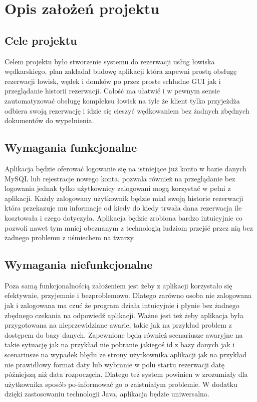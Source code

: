 \chapter{Opis założeń projektu}
\label{chap:opis}


\section*{Cele projektu}
Celem projektu było stworzenie systemu do rezerwacji usług łowiska wędkarskiego, plan zakładał budowę aplikacji która zapewni prostą obsługę rezerwacji łowisk, wędek i domków po przez proste schludne GUI jak i przeglądanie historii rezerwacji. Całość ma ułatwić i w pewnym sensie zautomatyzować
obsługę kompleksu łowisk na tyle że klient tylko przyjeżdża odbiera swoją rezerwację i idzie się cieszyć wędkowaniem bez żadnych zbędnych dokumentów do wypełnienia.

\section*{Wymagania funkcjonalne}
Aplikacja będzie oferować logowanie się na istniejące już konto w bazie danych MySQL lub rejestracje nowego konta, pozwala również na przeglądanie bez logowania jednak tylko użytkownicy zalogowani mogą korzystać w pełni z aplikacji. Każdy zalogowany użytkownik będzie miał swoją historie rezerwacji która przekazuje mu informacje od kiedy do kiedy trwała dana rezerwacja ile kosztowała i czego dotyczyła. Aplikacja będzie zrobiona bardzo intuicyjnie co pozwoli nawet tym mniej obeznanym z technologią ludziom przejść przez nią bez żadnego problemu z uśmiechem na twarzy.


\section*{Wymagania niefunkcjonalne}
Poza samą funkcjonalnością założeniem jest żeby z aplikacji korzystało się efektywnie, przyjemnie i bezproblemowo. Dlatego zarówno osoba nie zalogowana jak i zalogowana ma czuć że program działa intuicyjnie i płynie bez żadnego zbędnego czekania na odpowiedź aplikacji. Ważne jest też żeby aplikacja była przygotowana na nieprzewidziane awarie, takie jak na przykład problem z dostępem do bazy danych. Zapewnione będą również scenariusze awaryjne na takie sytuację jak na przykład nie pobranie jakiegoś id z bazy danych jak i scenariusze na wypadek błędu ze strony użytkownika aplikacji jak na przykład nie prawidłowy format daty lub wybranie w polu startu rezerwacji datę późniejszą niż data rozpoczęcia. Dlatego też system powinien w zrozumiały dla użytkownika sposób po-informować go o zaistniałym problemie. W dodatku dzięki zastosowaniu technologii Java, aplikacja będzie uniwersalna.